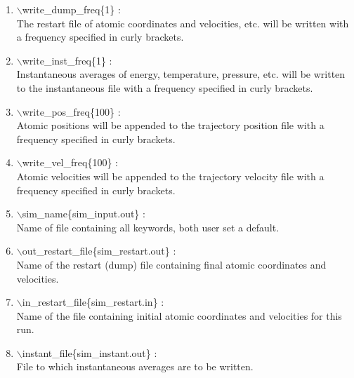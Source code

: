 \documentclass[12pt]{article}
\begin{document}
\begin{itemize}
\begin{enumerate}
 \vspace{0.15in} \Large
 \item   $\backslash$write\_dump\_freq\{1\} : \\
   \large
     The restart file of atomic coordinates and velocities, etc. will be
     written with a frequency specified in curly brackets.

 \vspace{0.15in}\Large
 \item   $\backslash$write\_inst\_freq\{1\} : \\
   \large
     Instantaneous averages of energy, temperature, pressure, etc. will be 
     written to the instantaneous file with a frequency specified in curly 
     brackets.

 \vspace{0.15in} \Large
 \item   $\backslash$write\_pos\_freq\{100\} : \\
  \large
    Atomic positions will be appended to the trajectory position file with
    a frequency specified in curly brackets.

 \vspace{0.15in} \Large
 \item   $\backslash$write\_vel\_freq\{100\} : \\
  \large
    Atomic velocities will be appended to the trajectory velocity file with
    a frequency specified in curly brackets.

 \vspace{0.15in} \Large
 \item   $\backslash$sim\_name\{sim\_input.out\} : \\
   \large
     Name of file containing all keywords, both user set a default.

 \vspace{0.15in} \Large
 \item   $\backslash$out\_restart\_file\{sim\_restart.out\} : \\
   \large Name of the restart (dump) file containing final atomic 
          coordinates and velocities.

 \vspace{0.15in} \Large
 \item   $\backslash$in\_restart\_file\{sim\_restart.in\} : \\
   \large
     Name of the file containing initial atomic coordinates and
     velocities for this run.


 \vspace{0.15in} \Large
 \item   $\backslash$instant\_file\{sim\_instant.out\} : \\
   \large
     File to which instantaneous averages are to be written.


\end{enumerate}
\end{itemize}
\end{document}
